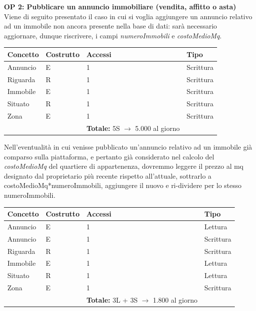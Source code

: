 \documentclass[a4paper,12pt]{report}
\begin{document}
            \textbf{OP 2: Pubblicare un annuncio immobiliare (vendita, affitto o asta)}
            Viene di seguito presentato il caso in cui si voglia aggiungere un annuncio relativo ad un immobile
            non ancora presente nella base di dati: sarà necessario aggiornare, dunque riscrivere, i campi 
            \textit{numeroImmobili} e \textit{costoMedioMq}.
        	\begin{table}[H]
            \centering
             \begin{tabular}{llll}
             \rowcolor{yellow!20} \textbf{Concetto} & \textbf{Costrutto} & \textbf{Accessi} & \textbf{Tipo} \\ [0.5ex] 
             \hline
             Annuncio & E & 1 & Scrittura \\ 
             Riguarda & R & 1 & Scrittura \\ 
             Immobile & E & 1 & Scrittura \\ 
             Situato & R & 1 & Scrittura \\ 
             Zona & E & 1 & Scrittura \\ 
             \hline
             \rowcolor{yellow!20}  \rowcolor{yellow!20} &   & \textbf{Totale:} 5S $\rightarrow$ 5.000 al giorno &  \\ [1ex] 
             \end{tabular}
            \end{table} 
            Nell'eventualità in cui venisse pubblicato un'annuncio relativo ad un immobile già comparso sulla
            piattaforma, e pertanto già considerato nel calcolo del \textit{costoMedioMq} del quartiere di
            appartenenza, dovremmo leggere il prezzo al mq designato dal proprietario più recente rispetto all'attuale, 
            sottrarlo a costoMedioMq*numeroImmobili, aggiungere il nuovo e ri-dividere per lo stesso numeroImmobili.
            
        	\begin{table}[H]
            \centering
             \begin{tabular}{llll}
             \rowcolor{yellow!20}\rowcolor{yellow!20} \textbf{Concetto} & \textbf{Costrutto} & \textbf{Accessi} & \textbf{Tipo}\\ [0.5ex] 
             \hline
             Annuncio & E & 1 & Lettura \\
             Annuncio & E & 1 & Scrittura \\
             Riguarda & R & 1 & Scrittura \\ 
             Immobile & E & 1 & Lettura \\ 
             Situato & R & 1 & Lettura \\ 
             Zona & E & 1 & Scrittura \\  
             \hline
             \rowcolor{yellow!20} &   & \textbf{Totale:} 3L + 3S $\rightarrow$ 1.800 al giorno &  \\ [1ex] 
             \end{tabular}
            \end{table}
\end{document}
